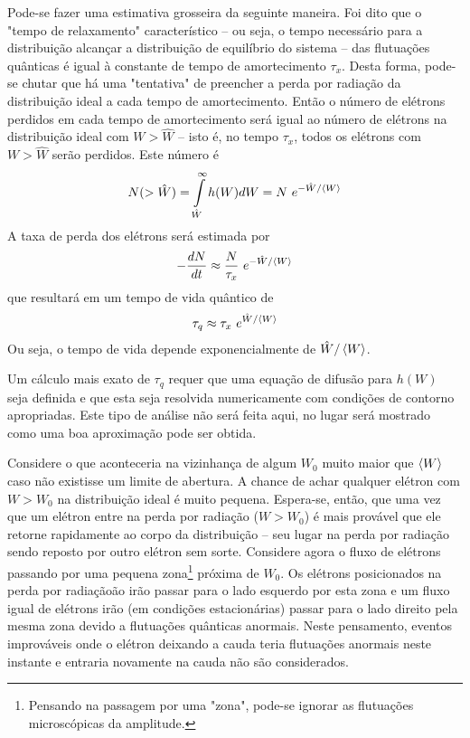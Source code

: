 Pode-se fazer uma estimativa grosseira da seguinte maneira. Foi dito que o "tempo de relaxamento" característico -- ou seja, o tempo necessário para a distribuição alcançar a distribuição de equilíbrio do sistema -- das flutuações quânticas é igual à constante de tempo de amortecimento $\tau_x$. Desta forma, pode-se chutar que há uma "tentativa" de preencher a perda por radiação da distribuição ideal a cada tempo de amortecimento. Então o número de elétrons perdidos em cada tempo de amortecimento será igual ao número de elétrons na distribuição ideal com $W> \hat{W}$ -- isto é, no tempo $\tau_x$, todos os elétrons com $W>\hat{W}$ serão perdidos. Este número é
\begin{align}
	N(>\hat{W}) = \int\limits_{\hat{W}}^{\infty}h(W)dW = N\ e^{-\hat{W}/\mean{W}}
\end{align}
A taxa de perda dos elétrons será estimada por
\begin{align}
	-\frac{dN}{dt} \approx \frac{N}{\tau_x}\ e^{-\hat{W}/\left< W \right>}
\end{align}
que resultará em um tempo de vida quântico de
\begin{align}
	\tau_q \approx \tau_x\ e^{\hat{W}/\left< W \right>}\label{eq:5.123}
\end{align}
Ou seja, o tempo de vida depende exponencialmente de $\hat{W}/\left< W \right>$.

Um cálculo mais exato de $\tau_q$ requer que uma equação de difusão para $h(W)$ seja definida e que esta seja resolvida numericamente com condições de contorno apropriadas. Este tipo de análise não será feita aqui, no lugar será mostrado como uma boa aproximação pode ser obtida.

Considere o que aconteceria na vizinhança de algum $W_0$ muito maior que $\left< W \right>$ caso não existisse um limite de abertura. A chance de achar qualquer elétron com $W>W_0$ na distribuição ideal é muito pequena. Espera-se, então, que uma vez que um elétron entre na perda por radiação ($W>W_0$) é mais provável que ele retorne rapidamente ao corpo da distribuição -- seu lugar na perda por radiação sendo reposto por outro elétron sem sorte. Considere agora o fluxo de elétrons passando por uma pequena zona\footnote{Pensando na passagem por uma "zona", pode-se ignorar as flutuações microscópicas da amplitude.} próxima de $W_0$. Os elétrons posicionados na perda por radiaçãoão irão passar para o lado esquerdo por esta zona e um fluxo igual de elétrons irão (em condições estacionárias) passar para o lado direito pela mesma zona devido a flutuações quânticas anormais. Neste pensamento, eventos improváveis onde o elétron deixando a cauda teria flutuações anormais neste instante e entraria novamente na cauda não são considerados.

